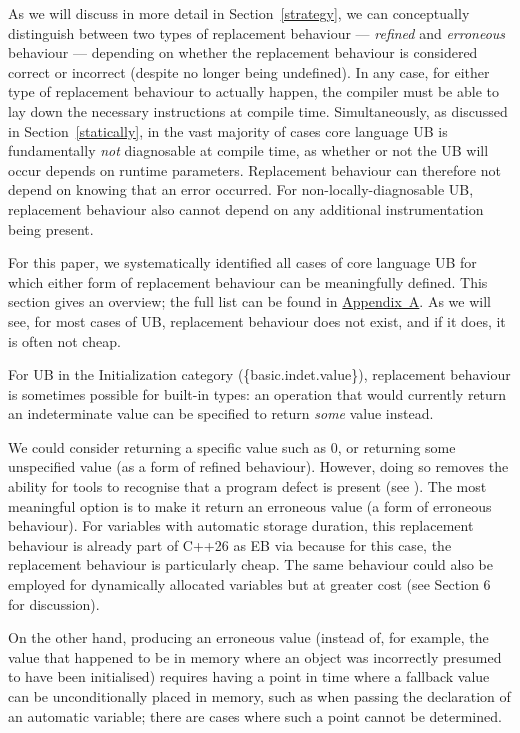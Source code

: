 As we will discuss in more detail in Section~\ref{strategy}, we can conceptually distinguish between two types of replacement behaviour --- \emph{refined} and \emph{erroneous} behaviour --- depending on whether the replacement behaviour is considered correct or incorrect (despite no longer being undefined). In any case, for either type of replacement behaviour to actually happen, the compiler must be able to lay down the necessary instructions at compile time. Simultaneously, as discussed in Section~\ref{statically}, in the vast majority of cases core language UB is fundamentally \emph{not} diagnosable at compile time, as whether or not the UB will occur depends on runtime parameters. Replacement behaviour can therefore not depend on knowing that an error occurred. For non-locally-diagnosable UB, replacement behaviour also cannot depend on any additional instrumentation being present.

For this paper, we systematically identified all cases of core language UB for which either form of replacement behaviour can be meaningfully defined. This section gives an overview; the full list can be found in \hyperref[appendix]{Appendix~A}. As we will see, for most cases of UB, replacement behaviour does not exist, and if it does, it is often not cheap.

For UB in the Initialization category (\{basic.indet.value\}), replacement behaviour is sometimes possible for built-in types: an operation that would currently return an indeterminate value can be specified to return \emph{some} value instead.


We could consider returning a specific value such as 0, or returning some unspecified value (as a form of refined behaviour). However, doing so removes the ability for tools to recognise that a program defect is present (see \cite{P2754R0}). The most meaningful option is to make it return an erroneous value (a form of erroneous behaviour). For variables with automatic storage duration, this replacement behaviour is already part of C++26 as EB via \cite{P2795R5} because for this case, the replacement behaviour is particularly cheap. The same  behaviour could also be employed for dynamically allocated variables but at greater cost (see \cite{P2723R1} Section 6 for discussion).

On the other hand, producing an erroneous value (instead of, for example, the value that happened to be in memory where an object was incorrectly presumed to have been initialised) requires having a point in time where a fallback value can be unconditionally placed in memory, such as when passing the declaration of an automatic variable; there are cases where such a point cannot be determined.

